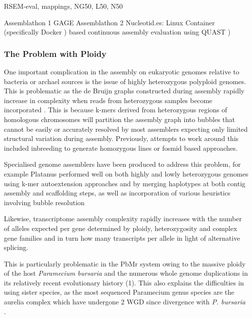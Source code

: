 RSEM-eval, mappings, NG50, L50, N50

Assemblathon 1 \citep{Earl2011}
GAGE \citep{Schatz2012}
Assemblathon 2 \citep{Bradnam2013}
Nucleotid.es: Linux Container (specifically Docker \citep{Merkel2014})  based continuous assembly evaluation using QUAST \citep{Gurevich2013a})


\subsubsection{The Problem with Ploidy}

One important complication in the assembly on eukaryotic genomes 
relative to bacteria or archael sources is the issue of highly heterozygous polyploid genomes.
This is problematic as the de Bruijn graphs constructed during assembly
rapidly increase in complexity when reads from heterozygous samples become
incorporated \citep{Kajitani2014}.  This is because k-mers derived from heterozygous regions of 
homologous chromosomes will partition the assembly graph into bubbles that cannot be easily 
or accurately resolved by most assemblers expecting only limited structural variation during
assembly.  Previously, attempts to work around this included inbreeding to generate
homozygous lines or fosmid based approaches.

Specialised genome assemblers have been produced to address this problem,
for example Platanus performed well on both highly and lowly heterozygous 
genomes using k-mer autoextension approaches and by merging haplotypes
at both contig assembly and scaffolding steps, as well as incorporation
of various heuristics involving bubble resolution \citep{Bradnam2013,Katjitani2014}

Likewise, transcriptome assembly complexity rapidly increases with the number of alleles
expected per gene determined by ploidy, heterozygosity and complex gene families
and in turn how many transcripts per allele in light of alternative splicing.

This is particularly problematic in the PbMr system owing to the massive
ploidy of the host \textit{Paramecium bursaria} and the numerous whole genome
duplications in its relatively recent evolutionary history (1).  This also 
explains the difficulties in using sister species, as the most sequenced Paramecium
genus species are the aurelia complex which have undergone 2 WGD since divergence with
\textit{P. bursaria} \citep{McGrath2014}.



